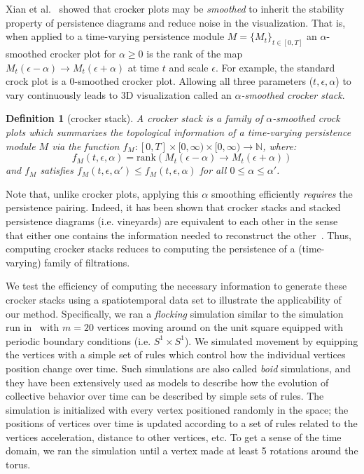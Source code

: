 \documentclass[sn-mathphys]{sn-jnl}
\newtheorem{definition}{Definition}
\begin{document}
Xian et al.~\cite{xian2020capturing} showed that crocker plots may be \emph{smoothed} to inherit the stability property of persistence diagrams and reduce noise in the visualization. That is, when applied to a time-varying persistence module $M = \{M_t\}_{t \in [0, T]}$ an $\alpha$-smoothed crocker plot for $\alpha \geq 0$ is the rank of the map $M_t(\epsilon - \alpha) \to M_t(\epsilon + \alpha)$ at time $t$ and scale $\epsilon$. For example, the standard crock plot is a $0$-smoothed crocker plot. Allowing all three parameters ($t, \epsilon, \alpha$) to vary continuously leads to 3D visualization called an $\alpha$\emph{-smoothed crocker stack}.
\begin{definition}[crocker stack]
	A crocker stack is a family of $\alpha$-smoothed crock plots which summarizes the topological information of a time-varying persistence module $M$ via the function $f_M : [0, T] \times [0, \infty) \times [0, \infty) \to \mathbb{N}$, where:
	$$ f_M(t,\epsilon, \alpha) = \mathrm{rank}(M_t(\epsilon - \alpha) \to M_t(\epsilon + \alpha)) $$
	and $f_M$ satisfies $f_M(t,\epsilon,\alpha') \leq f_M(t,\epsilon, \alpha)$ for all $0 \leq \alpha \leq \alpha'$.
\end{definition}
\noindent Note that, unlike crocker plots, applying this $\alpha$ smoothing efficiently \emph{requires} the persistence pairing. Indeed, it has been shown that crocker stacks and stacked persistence diagrams (i.e. vineyards) are equivalent to each other in the sense that either one contains the information needed to reconstruct the other~\cite{xian2020capturing}. Thus, computing crocker stacks reduces to computing the persistence of a (time-varying) family of filtrations.


We test the efficiency of computing the necessary information to generate these crocker stacks using a spatiotemporal data set to illustrate the applicability of our method. Specifically, we ran a \emph{flocking} simulation similar to the simulation run in~\cite{topaz2015topological} with $m = 20$ vertices moving around on the unit square equipped with periodic boundary conditions (i.e. $S^1 \times S^1$). We simulated movement by equipping the vertices with a simple set of rules which control how the individual vertices position change over time. Such simulations are also called \emph{boid} simulations, and they have been extensively used as models to describe how the evolution of collective behavior over time can be described by simple sets of rules.
The simulation is initialized with every vertex positioned randomly in the space; the positions of vertices over time is updated according to a set of rules related to the vertices acceleration, distance to other vertices, etc. To get a sense of the time domain, we ran the simulation until a vertex made at least 5 rotations around the torus. 
\end{document}
